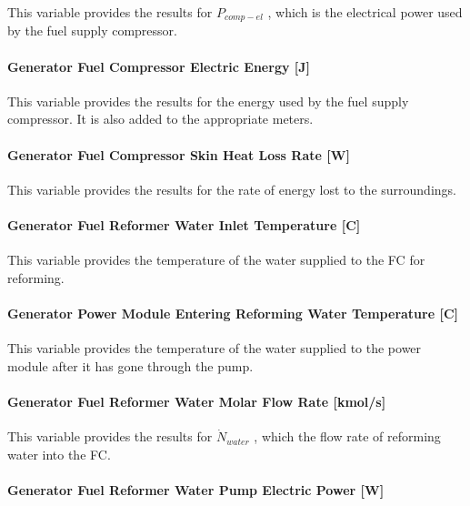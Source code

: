 This variable provides the results for \({P_{comp - el}}\) , which is the electrical power used by the fuel supply compressor.

\paragraph{Generator Fuel Compressor Electric Energy {[}J{]}}\label{generator-fuel-compressor-electric-energy-j}

This variable provides the results for the energy used by the fuel supply compressor. It is also added to the appropriate meters.

\paragraph{Generator Fuel Compressor Skin Heat Loss Rate {[}W{]}}\label{generator-fuel-compressor-skin-heat-loss-rate-w}

This variable provides the results for the rate of energy lost to the surroundings.

\paragraph{Generator Fuel Reformer Water Inlet Temperature {[}C{]}}\label{generator-fuel-reformer-water-inlet-temperature-c}

This variable provides the temperature of the water supplied to the FC for reforming.

\paragraph{Generator Power Module Entering Reforming Water Temperature {[}C{]}}\label{generator-power-module-entering-reforming-water-temperature-c}

This variable provides the temperature of the water supplied to the power module after it has gone through the pump.

\paragraph{Generator Fuel Reformer Water Molar Flow Rate {[}kmol/s{]}}\label{generator-fuel-reformer-water-molar-flow-rate-kmols}

This variable provides the results for \({\dot N_{water}}\) , which the flow rate of reforming water into the FC.

\paragraph{Generator Fuel Reformer Water Pump Electric Power {[}W{]}}\label{generator-fuel-reformer-water-pump-electric-power-w}

